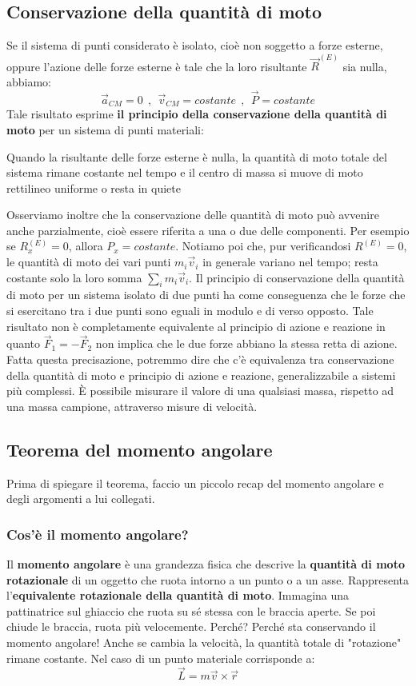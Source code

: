 \documentclass{article}
\numberwithin{equation}{subsection}
\begin{document}
\subsection{Conservazione della quantità di moto}
Se il sistema di punti considerato è isolato, cioè non soggetto a forze esterne, oppure l'azione delle forze esterne è tale che la loro risultante $\vec{R}^{(E)}$ sia nulla, abbiamo:
\begin{equation}
    \vec{a}_{CM}=0 \ \ ,\ \ \vec{v}_{CM}=costante \ \ , \ \ \vec{P}=costante
\end{equation}
Tale risultato esprime \textbf{il principio della conservazione della quantità di moto} per un sistema di punti materiali: 
\noindent
{}
\begin{shaded}
Quando la risultante delle forze esterne è nulla, la quantità di moto totale del sistema rimane costante nel tempo e il centro di massa si muove di moto rettilineo uniforme o resta in quiete
\end{shaded}
Osserviamo inoltre che la conservazione delle quantità di moto può avvenire anche parzialmente, cioè essere riferita a una o due delle componenti. Per esempio se $R_x^{(E)}=0$, allora $P_x=costante$. Notiamo poi che, pur verificandosi $R^{(E)}=0$, le quantità di moto dei vari punti $m_i\vec{v}_i$ in generale variano nel tempo; resta costante solo la loro somma $\sum_im_i\vec{v}_i$. Il principio di conservazione della quantità di moto per un sistema isolato di due punti ha come conseguenza che le forze che si esercitano tra i due punti sono eguali in modulo e di verso opposto. Tale risultato non è completamente equivalente al principio di azione e reazione in quanto $\vec{F}_1=-\vec{F}_2$ non implica che le due forze abbiano la stessa retta di azione. Fatta questa precisazione, potremmo dire che c'è equivalenza tra conservazione della quantità di moto e principio di azione e reazione, generalizzabile a sistemi più complessi. È possibile misurare il valore di una qualsiasi massa, rispetto ad una massa campione, attraverso misure di velocità.
\subsection{Teorema del momento angolare}
Prima di spiegare il teorema, faccio un piccolo recap del momento angolare e degli argomenti a lui collegati.
\subsubsection{Cos'è il momento angolare?}
Il \textbf{momento angolare} è una grandezza fisica che descrive la \textbf{quantità di moto rotazionale} di un oggetto che ruota intorno a un punto o a un asse. Rappresenta l'\textbf{equivalente rotazionale della quantità di moto}. Immagina una pattinatrice sul ghiaccio che ruota su sé stessa con le braccia aperte. Se poi chiude le braccia, ruota più velocemente. Perché? Perché sta conservando il momento angolare!
Anche se cambia la velocità, la quantità totale di "rotazione" rimane costante. Nel caso di un punto materiale corrisponde a:
\begin{equation}
    \vec{L}= m \vec{v} \times \vec{r}
\end{equation}
\end{document}
